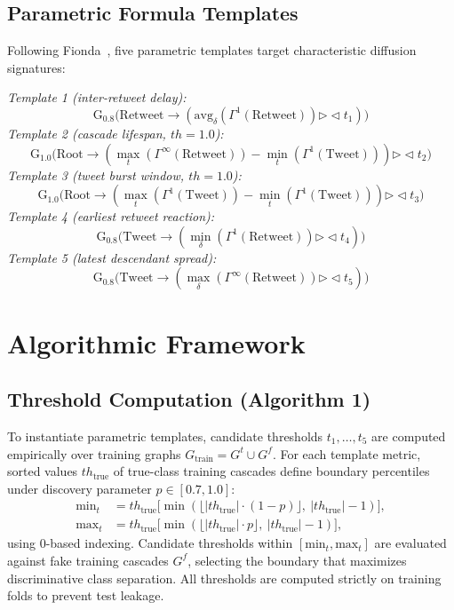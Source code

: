 \documentclass[10pt,twocolumn,a4paper]{article}
\renewcommand{\bowtie}{\mathrel{\triangleright\!\triangleleft}}
\begin{document}
\subsection{Parametric Formula Templates}
Following Fionda~\cite{fionda2025}, five parametric templates target characteristic diffusion signatures:
 
\textit{Template 1 (inter-retweet delay):}
\begin{equation*}
\mathrm{G}_{0.8}\big(\mathrm{Retweet}\to(\mathrm{avg}_{\delta}(\Gamma^1(\mathrm{Retweet}))\bowtie t_1)\big)
\end{equation*}
\textit{Template 2 (cascade lifespan, $th=1.0$):}
\begin{equation*}
\mathrm{G}_{1.0}\big(\mathrm{Root}\to(\max_{t}(\Gamma^{\infty}(\mathrm{Retweet}))-\min_{t}(\Gamma^{1}(\mathrm{Tweet})))\bowtie t_2\big)
\end{equation*}
\textit{Template 3 (tweet burst window, $th=1.0$):}
\begin{equation*}
\mathrm{G}_{1.0}\big(\mathrm{Root}\to(\max_{t}(\Gamma^{1}(\mathrm{Tweet}))-\min_{t}(\Gamma^{1}(\mathrm{Tweet})))\bowtie t_3\big)
\end{equation*}
\textit{Template 4 (earliest retweet reaction):}
\begin{equation*}
\mathrm{G}_{0.8}\big(\mathrm{Tweet}\to(\min_{\delta}(\Gamma^{1}(\mathrm{Retweet}))\bowtie t_4)\big)
\end{equation*}
\textit{Template 5 (latest descendant spread):}
\begin{equation*}
\mathrm{G}_{0.8}\big(\mathrm{Tweet}\to(\max_{\delta}(\Gamma^{\infty}(\mathrm{Retweet}))\bowtie t_5)\big)
\end{equation*}
 
\section{Algorithmic Framework}
\subsection{Threshold Computation (Algorithm 1)}
To instantiate parametric templates, candidate thresholds $t_1,\dots,t_5$ are computed empirically over training graphs $G_{\mathrm{train}}=G^{t}\cup G^{f}$. For each template metric, sorted values $th_{\mathrm{true}}$ of true-class training cascades define boundary percentiles under discovery parameter $p\in[0.7,1.0]$:
\begin{align}
\mathrm{min}_t &= th_{\mathrm{true}}\big[\min(\lfloor |th_{\mathrm{true}}|\cdot(1-p)\rfloor,\ |th_{\mathrm{true}}|-1)\big],\\
\mathrm{max}_t &= th_{\mathrm{true}}\big[\min(\lfloor |th_{\mathrm{true}}|\cdot p\rfloor,\ |th_{\mathrm{true}}|-1)\big],
\end{align}
using 0-based indexing. Candidate thresholds within $[\mathrm{min}_t, \mathrm{max}_t]$ are evaluated against fake training cascades $G^f$, selecting the boundary that maximizes discriminative class separation. All thresholds are computed strictly on training folds to prevent test leakage.
 
\end{document}

